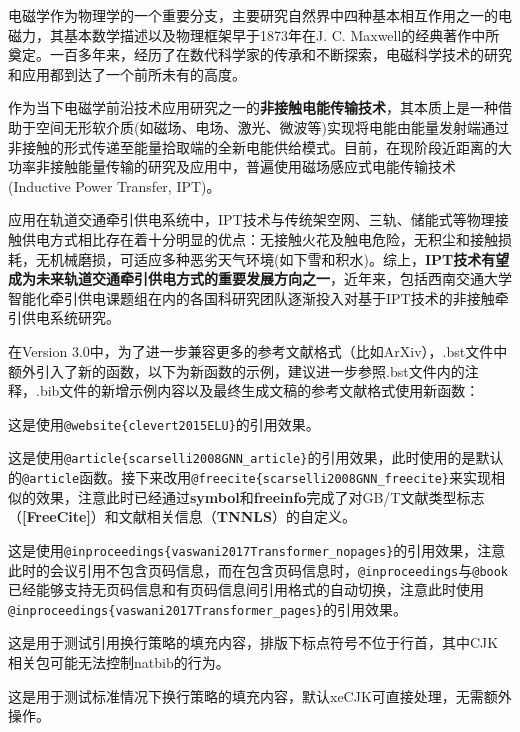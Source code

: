 \begin{framed}
	电磁学作为物理学的一个重要分支，主要研究自然界中四种基本相互作用之一的电磁力，其基本数学描述以及物理框架早于1873年在J. C. Maxwell的经典著作\cite{Maxwell1873}中所奠定。一百多年来，经历了在数代科学家的传承和不断探索\cite{Stratton1941,Cheng1989,Jackson1999,Guru2004,Kong2008,Griffiths2012,Purcell2013,Ida2015}，电磁科学技术的研究和应用都到达了一个前所未有的高度。
	
	作为当下电磁学前沿技术应用研究之一的\textbf{非接触电能传输技术}，其本质上是一种借助于空间无形软介质(如磁场、电场、激光、微波等)实现将电能由能量发射端通过非接触的形式传递至能量拾取端的全新电能供给模式\cite{黄学良2013}。目前，在现阶段近距离的大功率非接触能量传输的研究及应用中，普遍使用磁场感应式电能传输技术(Inductive Power Transfer, IPT)\cite{covic2013inductive}。
	
	应用在轨道交通牵引供电系统中，IPT技术与传统架空网、三轨、储能式等物理接触供电方式相比存在着十分明显的优点：无接触火花及触电危险，无积尘和接触损耗，无机械磨损，可适应多种恶劣天气环境(如下雪和积水)。综上，\textbf{IPT技术有望成为未来轨道交通牵引供电方式的重要发展方向之一}，近年来，包括西南交通大学智能化牵引供电课题组在内的各国科研究团队逐渐投入对基于IPT技术的非接触牵引供电系统研究\cite{Buja2015,Kim2015}。
\end{framed}

\par
在Version 3.0中，为了进一步兼容更多的参考文献格式（比如ArXiv），.bst文件中额外引入了新的函数，以下为新函数的示例，建议进一步参照.bst文件内的注释，.bib文件的新增示例内容以及最终生成文稿的参考文献格式使用新函数：

\begin{framed}
	这是使用\verb|@website{clevert2015ELU}|的引用效果\cite{clevert2015ELU}。

	这是使用\verb|@article{scarselli2008GNN_article}|的引用效果\cite{scarselli2008GNN_article}，此时使用的是默认的\verb|@article|函数。接下来改用\verb|@freecite{scarselli2008GNN_freecite}|来实现相似的效果，注意此时已经通过\textbf{symbol}和\textbf{freeinfo}完成了对GB/T文献类型标志（\textbf{[FreeCite]}）和文献相关信息（\textbf{TNNLS}）的自定义\cite{scarselli2008GNN_freecite}。

	这是使用\verb|@inproceedings{vaswani2017Transformer_nopages}|的引用效果，注意此时的会议引用不包含页码信息\cite{vaswani2017Transformer_nopages}，而在包含页码信息时，\verb|@inproceedings|与\verb|@book|已经能够支持无页码信息和有页码信息间引用格式的自动切换，注意此时使用\verb|@inproceedings{vaswani2017Transformer_pages}|的引用效果\cite{vaswani2017Transformer_pages}。

	这是用于测试引用换行策略的填充内容，排版下标点符号不位于行首\cite{clevert2015ELU,scarselli2008GNN_article,scarselli2008GNN_freecite,vaswani2017Transformer_nopages,vaswani2017Transformer_pages}，其中CJK相关包可能无法控制natbib的行为。

	这是用于测试标准情况下换行策略的填充内容，默认xeCJK可直接处理，无需额外操作。
\end{framed}


